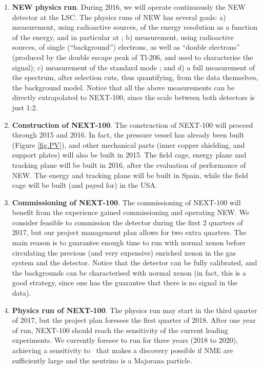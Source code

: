 \begin{enumerate}
\item {\bf NEW physics run}. During 2016, we will operate continuously the NEW detector at the LSC. The physics runs of NEW has several goals: a) measurement, using radioactive sources, of the energy resolution as a function of the energy, and in particular at \Qbb; b) measurement, using radioactive sources, of single (``background'') electrons, as well as ``double electrons'' (produced by the double escape peak of Tl-206, and used to characterise the signal); c) measurement of the standard mode \bbtnu; and d) a full measurement of the spectrum, after selection cuts, thus quantifying, from the data themselves, the background model. Notice that all the above measurements can be directly extrapolated to NEXT-100, since the scale between both detectors is just 1:2. 
%

\item {\bf Construction of NEXT-100}. The construction of NEXT-100 will proceed through 2015 and 2016. In fact, the pressure vessel has already been built (Figure \ref{fig.PV}), and other mechanical parts (inner copper shielding, and support plates) will also be built in 2015. The field cage, energy plane and tracking plane will be built in 2016, after the evaluation of performance of NEW. The energy and tracking plane will be built in Spain, while the field cage will be built (and payed for) in the USA.

\item {\bf Commissioning of NEXT-100}. The commissioning of NEXT-100 will benefit from the experience gained commissioning and operating NEW. We consider feasible to commission the detector during the first 2 quarters of 2017, but our project management plan allows for two extra quarters. The main reason is to guarantee enough time to run with normal xenon before circulating the precious (and very expensive) enriched xenon in the gas system and the detector. Notice that the detector can be fully calibrated, and the backgrounds can be characterised with normal xenon (in fact, this is a good strategy, since one has the guarantee that there is no signal in the data).  

\item {\bf Physics run of NEXT-100}. The physics run may start in the third quarter of 2017, but the project plan foresees the first quarter of 2018. After one year of run, NEXT-100 should reach the sensitivity of the current leading experiments. We currently foresee to run for three years (2018 to 2020), achieving a sensitivity to \mbb\ that makes a discovery possible if NME are sufficiently large and the neutrino is a Majorana particle. 


\end{enumerate}
